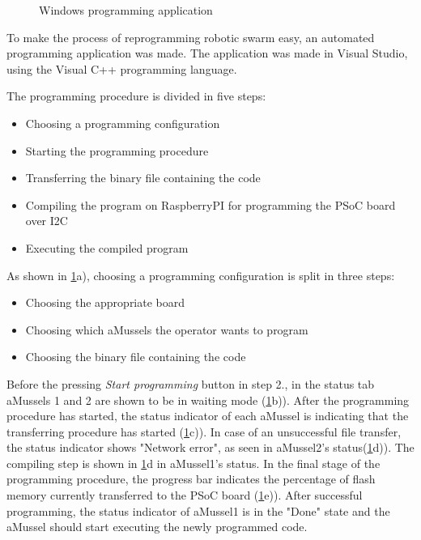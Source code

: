 \begin{figure} [h!]
\hfill
{}
\caption{Windows programming application}
\label{fig:windows_programming_application}
\end{figure}

To make the process of reprogramming robotic swarm easy, an automated programming application was made.
The application was made in Visual Studio, using the Visual C++ programming language.

The programming procedure is divided in five steps:
\begin{itemize}
\item Choosing a programming configuration
\item Starting the programming procedure
\item Transferring the binary file containing the code
\item Compiling the program on RaspberryPI for programming the PSoC board over I2C
\item Executing the compiled program

\end{itemize}

As shown in \ref{fig:windows_programming_application}a), choosing a programming configuration is split in three steps:
\begin{itemize}
\item Choosing the appropriate board
\item Choosing which aMussels the operator wants to program
\item Choosing the binary file containing the code
\end{itemize}

Before the pressing \textit{Start programming} button in step 2., in the status tab aMussels 1 and 2 are shown to be in waiting mode (\ref{fig:windows_programming_application}b)).
After the programming procedure has started, the status indicator of each aMussel is indicating that the transferring procedure has started (\ref{fig:windows_programming_application}c)).
In case of an unsuccessful file transfer, the status indicator shows "Network error", as seen in aMussel2's status(\ref{fig:windows_programming_application}d)).
The compiling step is shown in \ref{fig:windows_programming_application}d in aMussel1's status.
In the final stage of the programming procedure, the progress bar indicates the percentage of flash memory currently transferred to the PSoC board (\ref{fig:windows_programming_application}e)).
After successful programming, the status indicator of aMussel1 is in the "Done" state and the aMussel should start executing the newly programmed code.

